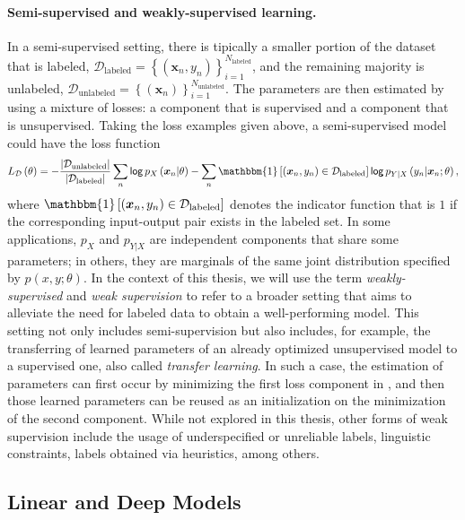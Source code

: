 \paragraph*{Semi-supervised and weakly-supervised learning.} In a
semi-supervised setting, there is tipically a smaller portion of the
dataset that is labeled,
$\mathcal{D}_{\text{labeled}}=
    \left\{(\bm{x}_n,y_n)\right\}_{i=1}^{N_{\text{labeled}}}$,
and the remaining majority is unlabeled,
$\mathcal{D}_{\text{unlabeled}}=
    \left\{(\bm{x}_n)\right\}_{i=1}^{N_{\text{unlabeled}}}$.
The parameters are then estimated by using a mixture of losses: a
component that is supervised and a component that is unsupervised.
Taking the loss examples given above, a semi-supervised model could
have the loss function
%
\begin{equation}
    L_{\mathcal D}\left(\theta\right)=
    -\frac{\left|\mathcal D_\text{unlabeled}\right|}{\left|\mathcal D_\text{labeled}\right|}
    \sum_n\log p_{X}\left(\bm{x}_n|\theta\right)
    -\sum_n\mathbbm{1}\left[(\bm{x}_n,y_n)\in\mathcal{D}_{\text{labeled}}\right]
    \log p_{Y|X}\left(y_n|\bm{x}_n;\theta\right),
    \label{eq:semisup}
\end{equation}
%
where
$\mathbbm{1}\left[(\bm{x}_n,y_n)\in\mathcal{D}_{\text{labeled}}\right]$
denotes the indicator function that is $1$ if the corresponding
input-output pair exists in the labeled set. In some applications,
$p_X$ and $p_{Y|X}$ are independent components that share some
parameters; in others, they are marginals of the same joint
distribution specified by $p(x, y;\theta)$. In the context of this
thesis, we will use the term \textit{weakly-supervised} and
\textit{weak supervision} to refer to a broader setting that aims to
alleviate the need for labeled data to obtain a well-performing
model. This setting not only includes semi-supervision but also
includes, for example, the transferring of learned parameters of an
already optimized unsupervised model to a supervised one, also called
\textit{transfer learning}. In such a case, the estimation of
parameters can first occur by minimizing the first loss component in
, and then those learned parameters can be reused
as an initialization on the minimization of the second component.
While not explored in this thesis, other forms of weak supervision
include the usage of underspecified or unreliable labels, linguistic
constraints, labels obtained via heuristics, among others.

\subsection{Linear and Deep Models}

